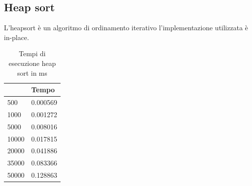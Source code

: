 \documentclass[12pt, a4paper]{report}
\begin{document}
\subsection{Heap sort}
L'heapsort è un algoritmo di ordinamento iterativo l'implementazione utilizzata è in-place.

	

\begin{table}[ht]
\centering
\begin{tabular}{| l | l |}
\hline
 & Tempo \\ \hline
500 & 0.000569 \\ \hline
1000 & 0.001272 \\ \hline
5000 & 0.008016 \\ \hline
10000 & 0.017815 \\ \hline
20000 & 0.041886 \\ \hline
35000 & 0.083366 \\ \hline
50000 & 0.128863 \\ \hline

\end{tabular}
\caption{Tempi di esecuzione heap sort in ms}
\label{Tab:Tempi esecuzione HeapSort}
\end{table}
\end{document}
